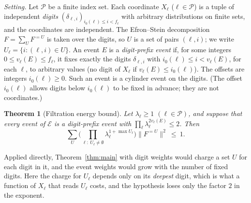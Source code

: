 \documentclass[11pt,reqno]{amsart}
\newtheorem{theorem}{Theorem}[section]
\theoremstyle{definition}
\newcommand{\cE}{\mathcal E}
\newcommand{\cP}{\mathcal P}
\begin{document}
\emph{Setting.}  Let $\cP$ be a finite index set.  Each coordinate $X_\ell$
($\ell\in\cP$) is a tuple of independent \emph{digits} $(\delta_{\ell,i})_{i_0(\ell)\le i<f_\ell}$ with
arbitrary distributions on finite sets, and the coordinates are independent.
The Efron--Stein decomposition $F=\sum_UF^{=U}$ is taken over the digits, so $U$
is a set of pairs $(\ell,i)$; we write $U_\ell=\{i:(\ell,i)\in U\}$.  An event $E$ is a
\emph{digit-prefix event} if, for some integers $0\le v_\ell(E)\le f_\ell$, it fixes exactly the
digits $\delta_{\ell,i}$ with $i_0(\ell)\le i<v_\ell(E)$, for each $\ell$, to arbitrary values (no
digit of $X_\ell$ if $v_\ell(E)\le i_0(\ell)$).  The offsets are integers $i_0(\ell)\ge0$.  Such
an event is a cylinder event on the digits.  (The offset $i_0(\ell)$ allows digits
below $i_0(\ell)$ to be fixed in advance; they are not coordinates.)

\begin{theorem}[Filtration energy bound]\label{thm:filtration}
Let $\lambda_\ell\ge1$ $(\ell\in\cP)$, and suppose that every event of $\cE$ is a digit-prefix
event with $\prod_\ell\lambda_\ell^{2v_\ell(E)}\le2$.  Then
\[
 \sum_U\Big(\prod_{\ell:\ U_\ell\ne\emptyset}\lambda_\ell^{1+\max U_\ell}\Big)\|F^{=U}\|^2\ \le\ 1 .
\]
\end{theorem}

Applied directly, Theorem~\ref{thm:main} with digit weights would charge a set
$U$ for each digit in it, and the event weights would grow with the number
of fixed digits.  Here the charge for $U_\ell$ depends only on its \emph{deepest}
digit, which is what a function of $X_\ell$ that reads $U_\ell$ costs, and the
hypothesis loses only the factor $2$ in the exponent.
\end{document}
